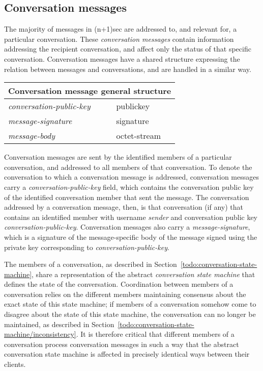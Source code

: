 \documentclass{article}
\def\field#1{\textit{#1}}
\begin{document}
\subsection{Conversation messages}
\label{sec:messages/conversation-messages}

The majority of messages in (n+1)sec are addressed to, and relevant for, a particular conversation.
These \emph{conversation messages} contain information addressing the recipient conversation, and affect only the status of that specific conversation.
Conversation messages have a shared structure expressing the relation between messages and conversations, and are handled in a similar way.

\begin{tabular}{|l|l|}
\hline
\multicolumn{2}{|c|}{Conversation message general structure} \\
\hline
\hline
\field{conversation-public-key} & \textsf{publickey} \\
\hline
\field{message-signature} & \textsf{signature} \\
\hline
\field{message-body} & \textsf{octet-stream} \\
\hline
\end{tabular}

Conversation messages are sent by the identified members of a particular conversation, and addressed to all members of that conversation.
To denote the conversation to which a conversation message is addressed, conversation messages carry a \field{conversation-public-key} field, which contains the conversation public key of the identified conversation member that sent the message.
The conversation addressed by a conversation message, then, is that conversation (if any) that contains an identified member with username \field{sender} and conversation public key \field{conversation-public-key}.
Conversation messages also carry a \field{message-signature}, which is a signature of the message-specific body of the message signed using the private key corresponding to \field{conversation-public-key}.

The members of a conversation, as described in Section~\ref{todo:conversation-state-machine}, share a representation of the abstract \emph{conversation state machine} that defines the state of the conversation.
Coordination between members of a conversation relies on the different members maintaining consensus about the exact state of this state machine; if members of a conversation somehow come to disagree about the state of this state machine, the conversation can no longer be maintained, as described in Section~\ref{todo:conversation-state-machine/inconsistency}.
It is therefore critical that different members of a conversation process conversation messages in such a way that the abstract conversation state machine is affected in precisely identical ways between their clients.
\end{document}
